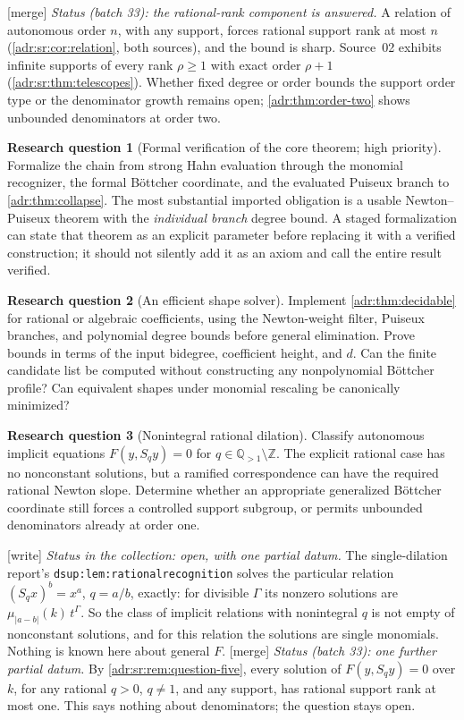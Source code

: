 \documentclass[11pt,letterpaper]{article}
\numberwithin{equation}{section}
\theoremstyle{definition}
\newtheorem{question}{Research question}
\theoremstyle{remark}
\newcommand{\Q}{\mathbb Q}
\newcommand{\Z}{\mathbb Z}
\newcommand{\abs}[1]{\lvert#1\rvert}
\newcommand{\lbl}[1]{\nolinkurl{#1}}%
\newcommand{\wtag}{\textup{[write]}}%
\newcommand{\mtag}{\textup{[merge]}}%
\begin{document}
\mtag{} \emph{Status (batch 33): the rational-rank component is answered.} A
relation of autonomous order $n$, with any support, forces rational support
rank at most $n$ (\cref{adr:sr:cor:relation}, both sources), and the bound
is sharp. Source~02 exhibits infinite supports of every rank $\rho\ge1$ with
exact order $\rho+1$ (\cref{adr:sr:thm:telescopes}). Whether fixed degree or
order bounds the support order type or the denominator growth remains open;
\cref{adr:thm:order-two} shows unbounded denominators at order two.

\begin{question}[Formal verification of the core theorem; high priority]
Formalize the chain from strong Hahn evaluation through the monomial
recognizer, the formal B\"ottcher coordinate, and the evaluated Puiseux
branch to \cref{adr:thm:collapse}. The most substantial imported obligation
is a usable Newton--Puiseux theorem with the \emph{individual branch}
degree bound. A staged formalization can state that theorem as an explicit
parameter before replacing it with a verified construction; it should
not silently add it as an axiom and call the entire result verified.
\end{question}

\begin{question}[An efficient shape solver]
Implement \cref{adr:thm:decidable} for rational or algebraic coefficients,
using the Newton-weight filter, Puiseux branches, and polynomial degree
bounds before general elimination. Prove bounds in terms of the input
bidegree, coefficient height, and $d$. Can the finite candidate list be
computed without constructing any nonpolynomial B\"ottcher profile?
Can equivalent shapes under monomial rescaling be canonically minimized?
\end{question}

\begin{question}[Nonintegral rational dilation]
Classify autonomous implicit equations $F(y,S_qy)=0$ for
$q\in\Q_{>1}\setminus\Z$. The explicit rational case has no nonconstant
solutions, but a ramified correspondence can have the required rational
Newton slope. Determine whether an appropriate generalized B\"ottcher
coordinate still forces a controlled support subgroup, or permits
unbounded denominators already at order one.
\end{question}

\wtag{} \emph{Status in the collection: open, with one partial datum.}
The single-dilation report's \lbl{dsup:lem:rationalrecognition} solves
the particular relation $(S_qx)^b=x^a$, $q=a/b$, exactly: for divisible
$\Gamma$ its nonzero solutions are $\mu_{\abs{a-b}}(k)\,t^\Gamma$. So
the class of implicit relations with nonintegral $q$ is not empty of
nonconstant solutions, and for this relation the solutions are single
monomials. Nothing is known here about general $F$.
\mtag{} \emph{Status (batch 33): one further partial datum.} By
\cref{adr:sr:rem:question-five}, every solution of $F(y,S_qy)=0$ over $k$, for
any rational $q>0$, $q\ne1$, and any support, has rational support rank at
most one. This says nothing about denominators; the question stays open.
\end{document}
